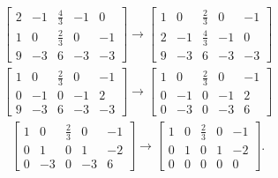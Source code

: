 \documentclass[12pt]{article}
\begin{document}
\begin{enumerate}
      \begin{align*}
        \begin{bmatrix}
          2 & -1 & \frac{4}{3} & -1 & 0\\
          1 & 0 & \frac{2}{3} & 0 & -1\\
          9 & -3 & 6 & -3 & -3
        \end{bmatrix}
        \xrightarrow{}
        \begin{bmatrix}
          1 & 0 & \frac{2}{3} & 0 & -1\\
          2 & -1 & \frac{4}{3} & -1 & 0\\
          9 & -3 & 6 & -3 & -3
        \end{bmatrix}
      \end{align*}
      \begin{align*}
        \begin{bmatrix}
          1 & 0 & \frac{2}{3} & 0 & -1\\
          0 & -1 & 0 & -1 & 2\\
          9 & -3 & 6 & -3 & -3
        \end{bmatrix}
        \xrightarrow{}
        \begin{bmatrix}
          1 & 0 & \frac{2}{3} & 0 & -1\\
          0 & -1 & 0 & -1 & 2\\
          0 & -3 & 0 & -3 & 6
        \end{bmatrix}
      \end{align*}
      \begin{align*}
        \begin{bmatrix}
          1 & 0 & \frac{2}{3} & 0 & -1\\
          0 & 1 & 0 & 1 & -2\\
          0 & -3 & 0 & -3 & 6
        \end{bmatrix}
        \xrightarrow{}
        \begin{bmatrix}
          1 & 0 & \frac{2}{3} & 0 & -1\\
          0 & 1 & 0 & 1 & -2\\
          0 & 0 & 0 & 0 & 0
        \end{bmatrix}.
      \end{align*}


\end{enumerate}
\end{document}
